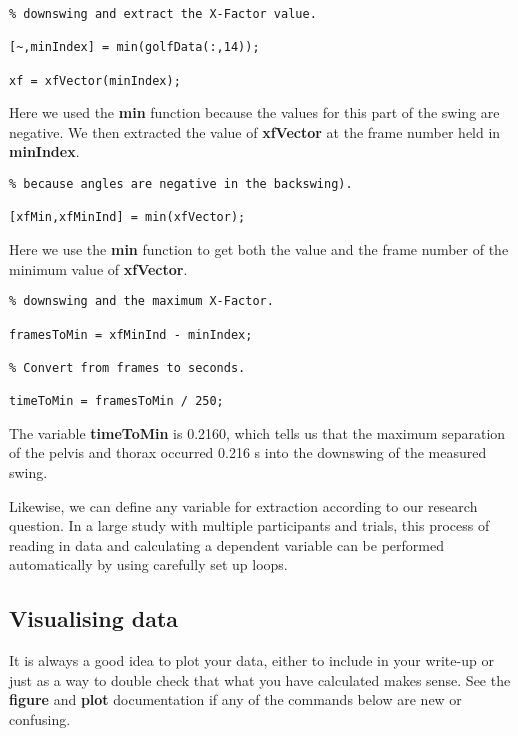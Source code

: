 \documentclass[12pt,a4paper]{article}
\begin{document}
\begin{lstlisting}[style=Matlab-editor]
% Determine the frame number of the start of the 
% downswing and extract the X-Factor value.

[~,minIndex] = min(golfData(:,14));

xf = xfVector(minIndex);
\end{lstlisting}

Here we used the \textbf{min} function because the values for this part of the swing are negative.
We then extracted the value of \textbf{xfVector} at the frame number held in \textbf{minIndex}.
 
\begin{lstlisting}[style=Matlab-editor]
% Calculate the maximum X-Factor (actually minimum 
% because angles are negative in the backswing).

[xfMin,xfMinInd] = min(xfVector);
\end{lstlisting}

Here we use the \textbf{min} function to get both the value and the frame number of the minimum value of \textbf{xfVector}.

\begin{lstlisting}[style=Matlab-editor]
% Determine the number of frames between the start of the
% downswing and the maximum X-Factor.

framesToMin = xfMinInd - minIndex;

% Convert from frames to seconds.

timeToMin = framesToMin / 250;
\end{lstlisting}

The variable \textbf{timeToMin} is 0.2160, which tells us that the maximum separation of the pelvis and thorax occurred 0.216 s into the downswing of the measured swing.

Likewise, we can define any variable for extraction according to our research question.
In a large study with multiple participants and trials, this process of reading in data and calculating a dependent variable can be performed automatically by using carefully set up loops.

\subsection{Visualising data}
It is always a good idea to plot your data, either to include in your write-up or just as a way to double check that what you have calculated makes sense.
See the \textbf{figure} and \textbf{plot} documentation if any of the commands below are new or confusing.
\end{document}
